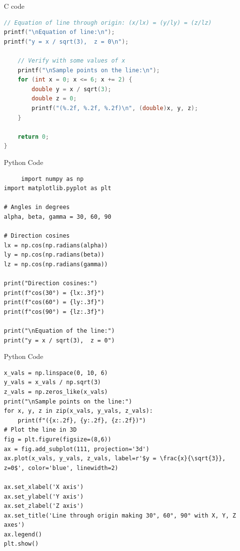 \documentclass{beamer}
\begin{document}
\begin{frame}[fragile]{C code}
\begin{lstlisting}[language = c]
// Equation of line through origin: (x/lx) = (y/ly) = (z/lz)
printf("\nEquation of line:\n");
printf("y = x / sqrt(3),  z = 0\n");

    // Verify with some values of x
    printf("\nSample points on the line:\n");
    for (int x = 0; x <= 6; x += 2) {
        double y = x / sqrt(3);
        double z = 0;
        printf("(%.2f, %.2f, %.2f)\n", (double)x, y, z);
    }

    return 0;
}
\end{lstlisting}  
\end{frame}

\begin{frame}[fragile]{Python Code}
 \begin{lstlisting}
     import numpy as np
import matplotlib.pyplot as plt

# Angles in degrees
alpha, beta, gamma = 30, 60, 90

# Direction cosines
lx = np.cos(np.radians(alpha))
ly = np.cos(np.radians(beta))
lz = np.cos(np.radians(gamma))

print("Direction cosines:")
print(f"cos(30°) = {lx:.3f}")
print(f"cos(60°) = {ly:.3f}")
print(f"cos(90°) = {lz:.3f}")

print("\nEquation of the line:")
print("y = x / sqrt(3),  z = 0")
\end{lstlisting}   
\end{frame}

\begin{frame}[fragile]{Python Code}
 \begin{lstlisting}
x_vals = np.linspace(0, 10, 6)
y_vals = x_vals / np.sqrt(3)
z_vals = np.zeros_like(x_vals)
print("\nSample points on the line:")
for x, y, z in zip(x_vals, y_vals, z_vals):
    print(f"({x:.2f}, {y:.2f}, {z:.2f})")
# Plot the line in 3D
fig = plt.figure(figsize=(8,6))
ax = fig.add_subplot(111, projection='3d')
ax.plot(x_vals, y_vals, z_vals, label=r'$y = \frac{x}{\sqrt{3}}, z=0$', color='blue', linewidth=2)

ax.set_xlabel('X axis')
ax.set_ylabel('Y axis')
ax.set_zlabel('Z axis')
ax.set_title('Line through origin making 30°, 60°, 90° with X, Y, Z axes')
ax.legend()
plt.show()

\end{lstlisting}   
\end{frame}
\end{document}
